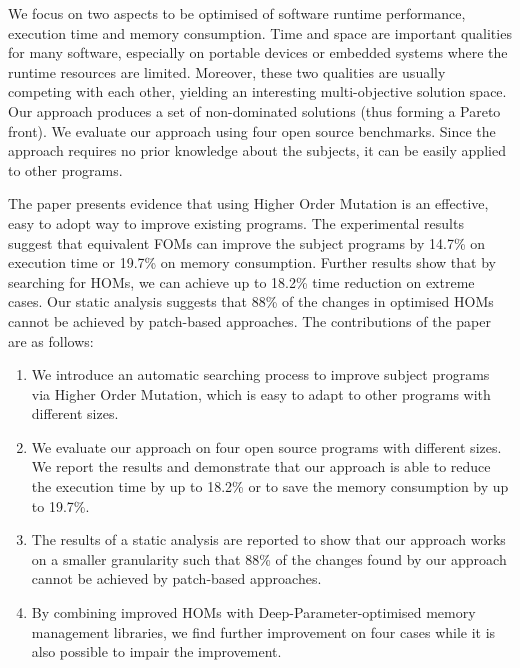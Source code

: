 \documentclass[oribibl]{llncs}
\begin{document}
We focus on two aspects to be optimised of software runtime performance, execution time and memory consumption.
Time and space are important qualities for many software, especially on portable devices or embedded systems where the runtime resources are limited.
Moreover, these two qualities are usually competing with each other, yielding an interesting multi-objective solution space.
Our approach produces a set of non-dominated solutions (thus forming a Pareto front).
We evaluate our approach using four open source benchmarks. 
Since the approach requires no prior knowledge about the subjects, it can be easily applied to other programs.

The paper presents evidence that using Higher Order Mutation is an effective, easy to adopt way to improve existing programs. 
The experimental results suggest that equivalent FOMs can improve the subject programs by 14.7\% on execution time or 19.7\% on memory consumption.
Further results show that by searching for HOMs, we can achieve up to 18.2\% time reduction on extreme cases.
Our static analysis suggests that 88\% of the changes in optimised HOMs cannot be achieved by patch-based approaches.
The contributions of the paper are as follows:
\begin{enumerate}
\item We introduce an automatic searching process to improve subject programs via Higher Order Mutation, which is easy to adapt to other programs with different sizes.
\item We evaluate our approach on four open source programs with different sizes. We report the results and demonstrate that our approach is able to reduce the execution time by up to 18.2\% or to save the memory consumption by up to 19.7\%.
\item The results of a static analysis are reported to show that our approach works on a smaller granularity such that 88\% of the changes found by our approach cannot be achieved by patch-based approaches.
\item By combining improved HOMs with Deep-Parameter-optimised memory management libraries, we find further improvement on four cases while it is also possible to impair the improvement.
\end{enumerate}

\end{document}
